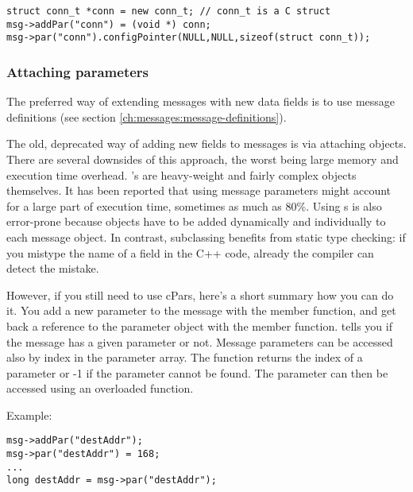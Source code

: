\begin{verbatim}
struct conn_t *conn = new conn_t; // conn_t is a C struct
msg->addPar("conn") = (void *) conn;
msg->par("conn").configPointer(NULL,NULL,sizeof(struct conn_t));
\end{verbatim}




\subsubsection{Attaching parameters}

The preferred way of extending messages with new data fields is to use
message definitions (see section \ref{ch:messages:message-definitions}).

The old, deprecated way of adding new fields to messages is via
attaching  objects.
There are several downsides of this approach, the worst being
large memory and execution time overhead. 's are
heavy-weight and fairly complex objects themselves.
It has been reported that using  message parameters
might account for a large part of execution time, sometimes as much as 80\%.
Using s is also error-prone because  objects
have to be added dynamically and individually to each message object.
In contrast, subclassing benefits from static type checking:
if you mistype the name of a field in the C++ code, already the compiler
can detect the mistake.


However, if you still need to use cPars, here's a short summary
how you can do it. You add a new parameter to the message with the
 member function, and get back a reference
to the parameter object with the  member function.
 tells you if the message has a
given parameter or not.
Message parameters can be accessed also by index in the parameter
array. The  function returns the index of a parameter
or -1 if the parameter cannot be found. The parameter can then be
accessed using an overloaded  function.

Example:

\begin{verbatim}
msg->addPar("destAddr");
msg->par("destAddr") = 168;
...
long destAddr = msg->par("destAddr");
\end{verbatim}




